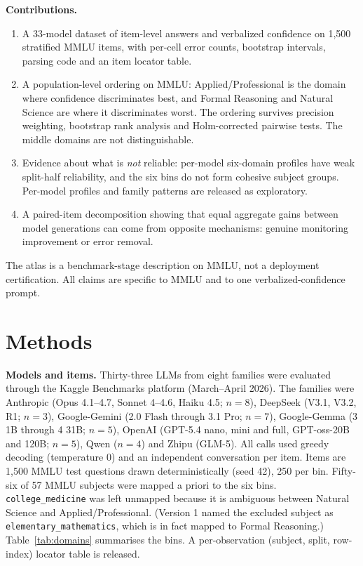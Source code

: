 \textbf{Contributions.}
\begin{enumerate}
\item A 33-model dataset of item-level answers and verbalized confidence on 1{,}500 stratified MMLU items, with per-cell error counts, bootstrap intervals, parsing code and an item locator table.
\item A population-level ordering on MMLU: Applied/Professional is the domain where confidence discriminates best, and Formal Reasoning and Natural Science are where it discriminates worst. The ordering survives precision weighting, bootstrap rank analysis and Holm-corrected pairwise tests. The middle domains are not distinguishable.
\item Evidence about what is \emph{not} reliable: per-model six-domain profiles have weak split-half reliability, and the six bins do not form cohesive subject groups. Per-model profiles and family patterns are released as exploratory.
\item A paired-item decomposition showing that equal aggregate gains between model generations can come from opposite mechanisms: genuine monitoring improvement or error removal.
\end{enumerate}

The atlas is a benchmark-stage description on MMLU, not a deployment certification. All claims are specific to MMLU and to one verbalized-confidence prompt.

\section{Methods}

\textbf{Models and items.} Thirty-three LLMs from eight families were evaluated through the Kaggle Benchmarks platform (March--April 2026). The families were Anthropic (Opus 4.1--4.7, Sonnet 4--4.6, Haiku 4.5; $n=8$), DeepSeek (V3.1, V3.2, R1; $n=3$), Google-Gemini (2.0 Flash through 3.1 Pro; $n=7$), Google-Gemma (3 1B through 4 31B; $n=5$), OpenAI (GPT-5.4 nano, mini and full, GPT-oss-20B and 120B; $n=5$), Qwen ($n=4$) and Zhipu (GLM-5). All calls used greedy decoding (temperature 0) and an independent conversation per item. Items are 1{,}500 MMLU test questions drawn deterministically (seed 42), 250 per bin. Fifty-six of 57 MMLU subjects were mapped a priori to the six bins. \texttt{college\_medicine} was left unmapped because it is ambiguous between Natural Science and Applied/Professional. (Version 1 named the excluded subject as \texttt{elementary\_mathematics}, which is in fact mapped to Formal Reasoning.) Table~\ref{tab:domains} summarises the bins. A per-observation (subject, split, row-index) locator table is released.

